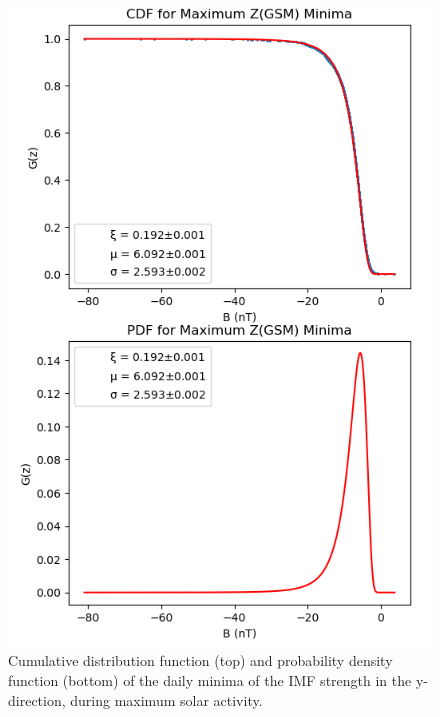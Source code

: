 \documentclass[11pt]{article}
\begin{document}
        \begin{figure}[t!]
            \begin{minipage}{0.48\textwidth}
                \centering
                \includegraphics[width=\textwidth]{fig_method/MFImaxZmin.png}
                \caption{Cumulative distribution function (top) and probability density function (bottom) of the daily minima of the IMF strength in the y-direction, during maximum solar activity.}
                \label{fig:MFImaxZmin}
            \end{minipage}
            \hfill
            \begin{minipage}{0.48\textwidth}
                \centering

\end{minipage}
\end{figure}
\end{document}
